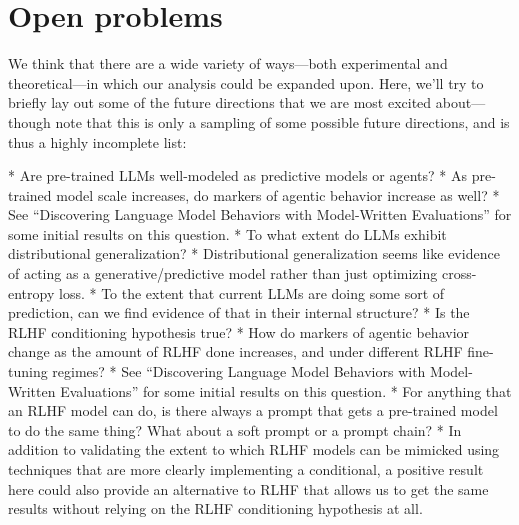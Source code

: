 {{\section{Open problems}
\label{sec:7}

We think that there are a wide variety of ways---both experimental and theoretical---in which our analysis could be expanded upon. Here, we'll try to briefly lay out some of the future directions that we are most excited about---though note that this is only a sampling of some possible future directions, and is thus a highly incomplete list:



* Are pre-trained LLMs well-modeled as predictive models or agents?
    * As pre-trained model scale increases, do markers of agentic behavior\cite{TODO: cite TODO: link appendix} increase as well?
        * See ``Discovering Language Model Behaviors with Model-Written Evaluations\cite{TODO: cite https://www.alignmentforum.org/posts/yRAo2KEGWenKYZG9K/discovering-language-model-behaviors-with-model-written}'' for some initial results on this question.
    * To what extent do LLMs exhibit distributional generalization\cite{TODO: cite https://arxiv.org/abs/2009.08092}?
        * Distributional generalization seems like evidence of acting as a generative/predictive model rather than just optimizing cross-entropy loss.
    * To the extent that current LLMs are doing some sort of prediction, can we find evidence of that in their internal structure?
* Is the RLHF conditioning hypothesis true?
    * How do markers of agentic behavior\cite{TODO: cite TODO} change as the amount of RLHF done increases, and under different RLHF fine-tuning regimes?
        * See ``Discovering Language Model Behaviors with Model-Written Evaluations\cite{TODO: cite https://www.alignmentforum.org/posts/yRAo2KEGWenKYZG9K/discovering-language-model-behaviors-with-model-written}'' for some initial results on this question.
    * For anything that an RLHF model can do, is there always a prompt that gets a pre-trained model to do the same thing? What about a soft prompt\cite{TODO: cite https://aclanthology.org/2021.emnlp-main.243.pdf} or a prompt chain\cite{TODO: cite https://arxiv.org/abs/2203.06566}?
        * In addition to validating the extent to which RLHF models can be mimicked using techniques that are more clearly implementing a conditional, a positive result here could also provide an alternative to RLHF that allows us to get the same results without relying on the RLHF conditioning hypothesis at all.
}}
